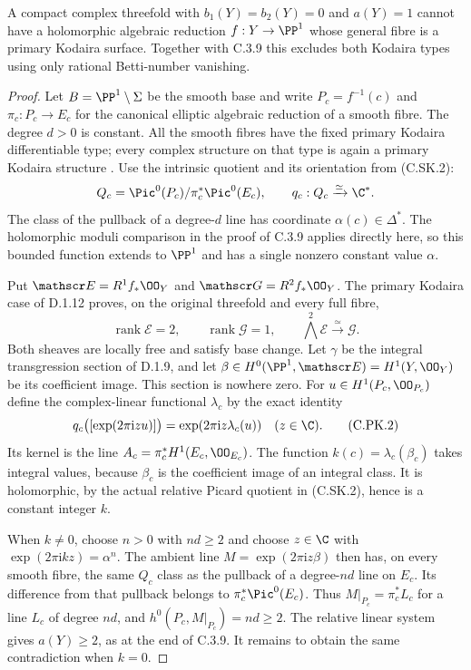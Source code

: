 \begin{theorem}
\label{st:C.3.10}
A compact complex threefold with $b_1(Y)=b_2(Y)=0$ and
$a(Y)=1$ cannot have a holomorphic algebraic reduction
$f:Y\to\PP^1$ whose general fibre is a primary Kodaira
surface. Together with C.3.9 this excludes both Kodaira
types using only rational Betti-number vanishing.
\end{theorem}
\begin{proof}
Let $B=\PP^1\setminus\Sigma$ be the smooth base and write
$P_c=f^{-1}(c)$ and $\pi_c:P_c\to E_c$ for the canonical
elliptic algebraic reduction of a smooth fibre. The degree
$d>0$ is constant. All the smooth fibres have the fixed
primary Kodaira differentiable type; every complex structure
on that type is again a primary Kodaira structure
\cite[pp.~373--374]{Borcea1984}.
Use the intrinsic quotient and its orientation from (C.SK.2):
\[
 Q_c=\Pic^0(P_c)/\pi_c^*\Pic^0(E_c),\qquad
 q_c:Q_c\xrightarrow{\simeq}\C^*.
\]
The class of the pullback of a degree-$d$ line has coordinate
$\alpha(c)\in\Delta^*$. The holomorphic moduli comparison
in the proof of C.3.9 applies directly here, so this bounded
function extends to $\PP^1$ and has a single nonzero
constant value $\alpha$.

Put $\mathscr E=R^1f_*\OO_Y$ and
$\mathscr G=R^2f_*\OO_Y$. The primary Kodaira case of
D.1.12 proves, on the original threefold and every full fibre,
\[
 \operatorname{rank}\mathscr E=2,\qquad
 \operatorname{rank}\mathscr G=1,\qquad
 \bigwedge^2\mathscr E\xrightarrow{\simeq}\mathscr G.
\tag{C.PK.1}
\]
Both sheaves are locally free and satisfy base change.
Let $\gamma$ be the integral transgression section of D.1.9,
and let $\beta\in H^0(\PP^1,\mathscr E)=H^1(Y,\OO_Y)$
be its coefficient image. This section is nowhere zero.
For $u\in H^1(P_c,\OO_{P_c})$ define the complex-linear
functional $\lambda_c$ by the exact identity
\[
 q_c\bigl([\exp(2\pi\mathrm i z u)]\bigr)
     =\exp(2\pi\mathrm i z\lambda_c(u))
     \quad(z\in\C).
\tag{C.PK.2}
\]
Its kernel is the line
$A_c=\pi_c^*H^1(E_c,\OO_{E_c})$.
The function $k(c)=\lambda_c(\beta_c)$ takes integral
values, because $\beta_c$ is the coefficient image of
an integral class. It is holomorphic, by the actual relative
Picard quotient in (C.SK.2), hence is a constant integer $k$.

When $k\ne0$, choose $n>0$ with $nd\ge2$ and choose
$z\in\C$ with $\exp(2\pi\mathrm i kz)=\alpha^n$.
The ambient line $M=\exp(2\pi\mathrm i z\beta)$ then
has, on every smooth fibre, the same $Q_c$ class as the
pullback of a degree-$nd$ line on $E_c$. Its difference
from that pullback belongs to $\pi_c^*\Pic^0(E_c)$.
Thus
$M|_{P_c}=\pi_c^*L_c$ for a line $L_c$ of degree $nd$,
and $h^0(P_c,M|_{P_c})=nd\ge2$. The relative linear
system gives $a(Y)\ge2$, as at the end of C.3.9.
It remains to obtain the same contradiction when $k=0$.


\end{proof}
